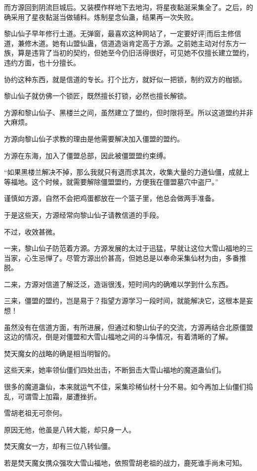 \begin{this_body}
而方源回到阴流巨城后。又装模作样地下去地沟，将星夜黏涎采集全了。之后，的确采用了星夜黏涎当做辅料。炼制星念仙蛊，结果再一次失败。

黎山仙子早年修行土道。无弹窗，最喜欢这种网站了，一定要好评]而后主修信道，兼修木道。她有山盟仙蛊，信道造诣肯定高于方源。之前她主动对付东方一族，算是违背了当初的契约，但她至今仍旧活得很好，可见她不仅擅长建立盟约，违约方面，也十分擅长。

协约这种东西，就是信道的专长。打个比方，就好似一把锁，制约双方的枷锁。

黎山仙子就仿佛一个锁匠，既然擅长打锁，必然也擅长解锁。

方源和黎山仙子、黑楼兰之间，虽然建立了盟约，但时限将至。所以这道盟约并非大麻烦。

方源向黎山仙子求教的理由是他需要解决加入僵盟的盟约。

方源在东海，加入了僵盟总部，因此被僵盟盟约束缚。

“如果黑楼兰解决不掉，那么我就只有退而求其次，收集大量的力道仙僵，成就上等福地。这个时候，就需要解除僵盟盟约，方便我在僵盟墓穴中盗尸。”

谨慎如方源，自然不会把鸡蛋都放在一个篮子里，他总会做两手准备。

于是这些天，方源经常向黎山仙子请教信道的手段。

不过，收效甚微。

一来，黎山仙子防范着方源。方源发展的太过于迅猛，早就让这位大雪山福地的三当家，心生忌惮了。尽管方源出价甚高，但她总是以奉命采集仙材为由，多番推脱。

二来，方源对信道了解泛泛，造诣很浅，短时间内的确难以学到什么东西。

三来，僵盟的盟约，岂是易于？指望方源学习一段时间，就能解决它，这根本是妄想！

虽然没有在信道方面，有所进展，但通过和黎山仙子的交流，方源再结合北原僵盟这边的情况，倒是对僵盟和大雪山福地之间的斗争情况，有着清晰的了解。

焚天魔女的战略的确是相当明智的。

这些天来，她率领仙僵们四处出击，不断狙击大雪山福地的魔道蛊仙们。

很多的魔道蛊仙，本来就运气不佳，采集珍稀仙材十分不易。如今再加上仙僵们捣乱，可谓雪上加霜，屡遭挫折。

雪胡老祖无可奈何。

原因无他，他虽是八转大能，却只身一人。

焚天魔女一方，却有三位八转仙僵。

若是焚天魔女携众强攻大雪山福地，依照雪胡老祖的战力，鹿死谁手尚未可知。


\end{this_body}
